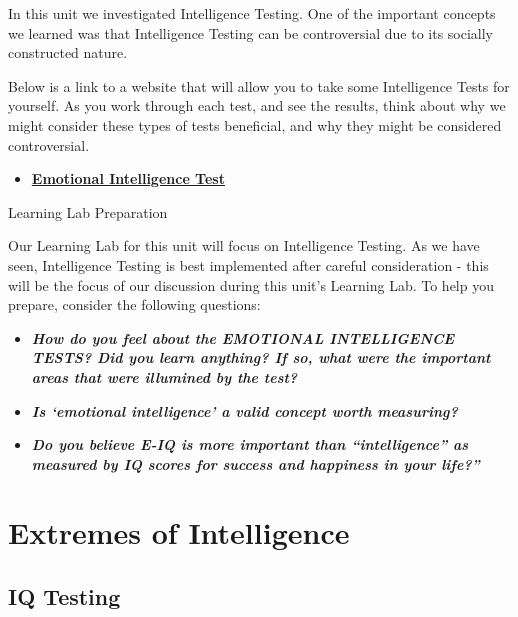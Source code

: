 \documentclass[
]{book}
\providecommand{\tightlist}{%
  \setlength{\itemsep}{0pt}\setlength{\parskip}{0pt}}
\begin{document}
\begin{reflect}
In this unit we investigated Intelligence Testing. One of the important concepts we learned was that Intelligence Testing can be controversial due to its socially constructed nature.

Below is a link to a website that will allow you to take some Intelligence Tests for yourself. As you work through each test, and see the results, think about why we might consider these types of tests beneficial, and why they might be considered controversial.

\begin{itemize}
\tightlist
\item
  \href{https://www.queendom.com/tests/}{\textbf{Emotional Intelligence Test}}
\end{itemize}

{Learning Lab Preparation}

Our Learning Lab for this unit will focus on Intelligence Testing. As we have seen, Intelligence Testing is best implemented after careful consideration - this will be the focus of our discussion during this unit's Learning Lab. To help you prepare, consider the following questions:

\begin{itemize}
\tightlist
\item
  \textbf{\emph{How do you feel about the EMOTIONAL INTELLIGENCE TESTS? Did you learn anything? If so, what were the important areas that were illumined by the test?}}\\
\item
  \textbf{\emph{Is `emotional intelligence' a valid concept worth measuring?}}\\
\item
  \textbf{\emph{Do you believe E-IQ is more important than ``intelligence'' as measured by IQ scores for success and happiness in your life?''}}
\end{itemize}
\end{reflect}

\hypertarget{extremes-of-intelligence}{%
\section{Extremes of Intelligence}\label{extremes-of-intelligence}}

\hypertarget{iq-testing}{%
\subsection*{IQ Testing}\label{iq-testing}}
\end{document}
